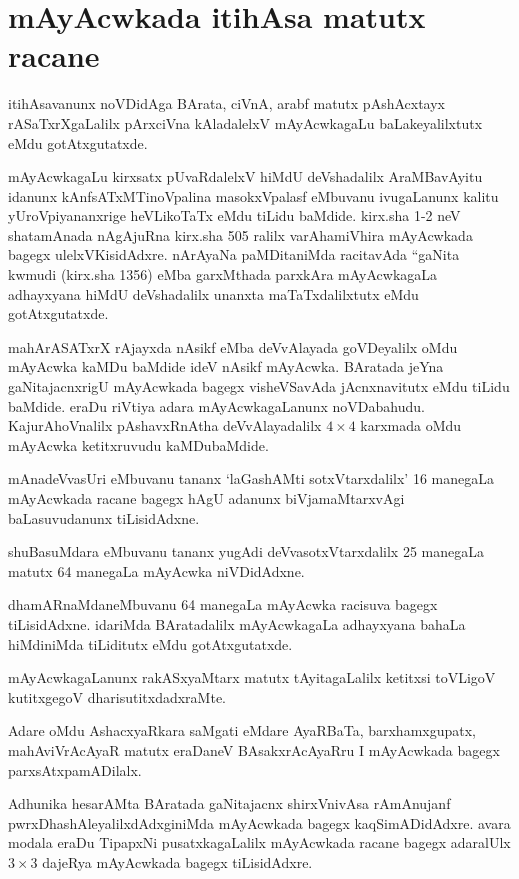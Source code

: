\chapter{mAyAcwkada itihAsa matutx racane}

itihAsavanunx noVDidAga BArata, ciVnA, arabf matutx pAshAcxtayx rASaTxrXgaLalilx pArxciVna kAladalelxV mAyAcwkagaLu baLakeyalilxtutx eMdu gotAtxgutatxde.

mAyAcwkagaLu kirxsatx pUvaRdalelxV hiMdU deVshadalilx AraMBavAyitu idanunx kAnfsATxMTinoVpalina masokxVpalasf eMbuvanu ivugaLanunx kalitu yUroVpiyananxrige heVLikoTaTx eMdu tiLidu baMdide. kirx.sha {\rm 1-2} neV shatamAnada nAgAjuRna kirx.sha {\rm 505} ralilx varAhamiVhira mAyAcwkada bagegx ulelxVKisidAdxre. nArAyaNa paMDitaniMda racitavAda ``gaNita kwmudi (kirx.sha {\rm 1356}) eMba garxMthada parxkAra mAyAcwkagaLa adhayxyana hiMdU deVshadalilx unanxta maTaTxdalilxtutx eMdu gotAtxgutatxde.

mahArASATxrX rAjayxda nAsikf eMba deVvAlayada goVDeyalilx oMdu mAyAcwka kaMDu baMdide ideV nAsikf mAyAcwka. BAratada jeYna gaNitajacnxrigU mAyAcwkada bagegx visheVSavAda jAcnxnavitutx eMdu tiLidu baMdide. eraDu riVtiya adara mAyAcwkagaLanunx noVDabahudu. KajurAhoVnalilx pAshavxRnAtha deVvAlayadalilx $4\times 4$ karxmada oMdu mAyAcwka ketitxruvudu kaMDubaMdide.

mAnadeVvasUri eMbuvanu tananx `laGashAMti sotxVtarxdalilx' {\rm 16} manegaLa mAyAcwkada racane bagegx hAgU adanunx biVjamaMtarxvAgi baLasuvudanunx tiLisidAdxne.

shuBasuMdara eMbuvanu tananx yugAdi deVvasotxVtarxdalilx {\rm 25} manegaLa matutx {\rm 64} manegaLa mAyAcwka niVDidAdxne.

dhamARnaMdaneMbuvanu {\rm 64} manegaLa mAyAcwka racisuva bagegx tiLisidAdxne. idariMda BAratadalilx mAyAcwkagaLa adhayxyana bahaLa hiMdiniMda tiLiditutx eMdu gotAtxgutatxde.

mAyAcwkagaLanunx rakASxyaMtarx matutx tAyitagaLalilx ketitxsi toVLigoV kutitxgegoV dharisutitxdadxraMte.

Adare oMdu AshacxyaRkara saMgati eMdare AyaRBaTa, barxhamxgupatx, mahAviVrAcAyaR matutx eraDaneV BAsakxrAcAyaRru I mAyAcwkada bagegx parxsAtxpamADilalx.

Adhunika hesarAMta BAratada gaNitajacnx shirxVnivAsa rAmAnujanf pwrxDhashAleyalilxdAdxginiMda mAyAcwkada bagegx kaqSimADidAdxre. avara modala eraDu TipapxNi pusatxka\-gaLalilx mAyAcwkada racane bagegx adaralUlx $3\times 3$ dajeRya mAyAcwkada bagegx tiLisidAdxre.

